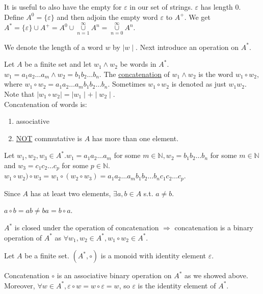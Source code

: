\documentclass[10pt]{article}
\begin{document}
\begin{description}
\begin{enumerate}
			It is useful to also have the empty for $\varepsilon$ in our set of strings. $\varepsilon$ has length 0. Define $A^0 = \{\varepsilon\}$ and then adjoin the empty word $\varepsilon$ to $A^+$. We get $A^* = \{\varepsilon\} \cup A^+ = A^0 \cup \underset{n=1}{\overset{\infty}{\cup}} A^n = \underset{n=0}{\overset{\infty}{\cup}} A^n$.
		\end{enumerate}
		\item[Notation:] We denote the length of a word $w$ by $\mid w\mid$. Next introduce an operation on $A^*$.
		\item[Definition:] Let $A$ be a finite set and let $w_1 \land w_2$ be words in $A^*$. $w_1 = a_1a_2\dots a_m \land w_2 = b_1b_2\dots b_n$. The \underline{concatenation} of $w_1 \land w_2$ is the word $w_1 \circ w_2$, where $w_1 \circ w_2 = a_1a_2\dots a_mb_1b_2\dots b_n$. Sometimes $w_1 \circ w_2$ is denoted as just $w_1w_2$. Note that $\mid w_1 \circ w_2 \mid = \mid w_1 \mid + \mid w_2 \mid$. \\
		Concatenation of words is:
		\begin{enumerate}
			\item associative
			\item \underline{NOT} commutative is $A$ has more than one element.
		\end{enumerate}
		\begin{description}
			\item[Proof of (1):] Let $w_1, w_2, w_3 \in A^*. w_1 = a_1a_2\dots a_m$ for some $m \in \mathbb{N}, w_2=b_1b_2\dots b_n$ for some $m \in \mathbb{N}$ and $w_3 = c_1c_2\dots c_p$ for some $p \in \mathbb{N}$. $w_1 \circ w_2) \circ w_3 = w_1 \circ (w_2 \circ w_3) = a_1a_2\dots a_mb_1b_2\dots b_nc_1c_2\dots c_p$.
			\item[qed]
			\item[Proof of (2):] Since $A$ has at least two elements, $\exists a, b \in A$ s.t. $a \neq b$.
			\item $a \circ b = ab \neq ba = b \circ a$.
			\item[qed]
		\end{description}
		\item $A^*$ is closed under the operation of concatenation $\Rightarrow$ concatenation is a binary operation of $A^*$ as $\forall w_1, w_2 \in A^*, w_1 \circ w_2 \in A^*$.
		\item[Theorem] Let $A$ be a finite set. $(A^*, \circ)$ is a monoid with identity element $\varepsilon$.
		\item[Proof:] Concatenation $\circ$ is an associative binary operation on $A^*$ as we showed above. Moreover, $\forall w \in A^*, \varepsilon \circ w = w \circ \varepsilon = w$, so $\varepsilon$ is the identity element of $A^*$.

\end{description}
\end{document}

